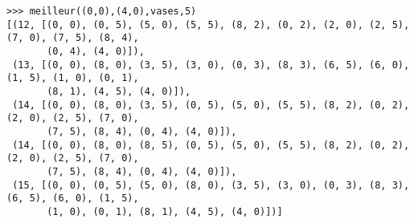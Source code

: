 \begin{question}
\begin{minipage}{\textwidth}
\begin{Verbatim}
>>> meilleur((0,0),(4,0),vases,5)
[(12, [(0, 0), (0, 5), (5, 0), (5, 5), (8, 2), (0, 2), (2, 0), (2, 5), (7, 0), (7, 5), (8, 4),
       (0, 4), (4, 0)]), 
 (13, [(0, 0), (8, 0), (3, 5), (3, 0), (0, 3), (8, 3), (6, 5), (6, 0), (1, 5), (1, 0), (0, 1), 
       (8, 1), (4, 5), (4, 0)]), 
 (14, [(0, 0), (8, 0), (3, 5), (0, 5), (5, 0), (5, 5), (8, 2), (0, 2), (2, 0), (2, 5), (7, 0),
       (7, 5), (8, 4), (0, 4), (4, 0)]), 
 (14, [(0, 0), (8, 0), (8, 5), (0, 5), (5, 0), (5, 5), (8, 2), (0, 2), (2, 0), (2, 5), (7, 0),
       (7, 5), (8, 4), (0, 4), (4, 0)]), 
 (15, [(0, 0), (0, 5), (5, 0), (8, 0), (3, 5), (3, 0), (0, 3), (8, 3), (6, 5), (6, 0), (1, 5),
       (1, 0), (0, 1), (8, 1), (4, 5), (4, 0)])]
\end{Verbatim}
\end{minipage}

\end{question}

